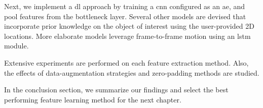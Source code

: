 Next, we implement a \gls{dl} approach by training a \gls{cnn} configured as an \gls{ae}, and pool features from the bottleneck layer.
Several other models are devised that incorporate prior knowledge on the object of interest using the user-provided 2D locations.
More elaborate models leverage frame-to-frame motion using an \gls{lstm} module.

Extensive experiments are performed on each feature extraction method.
Also, the effects of data-augmentation strategies and zero-padding methods are studied.

In the conclusion section, we summarize our findings and select the best performing feature learning method for the next chapter.

\endinput

